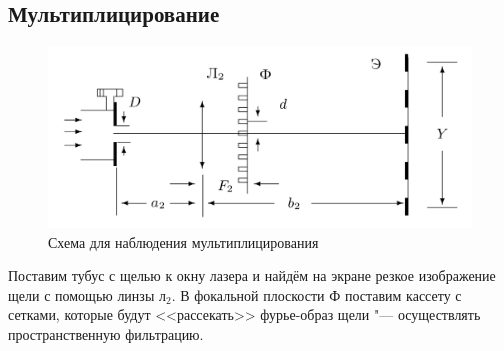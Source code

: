\documentclass[a4paper, 12pt]{article}%
\begin{document}
\subsection{Мультиплицирование}
\begin{figure}[H]
	\includegraphics[width = 1.0\linewidth]{pics/4.png}
	\caption*{Схема для наблюдения мультиплицирования}
\end{figure}	
Поставим тубус с щелью к окну лазера и найдём на экране резкое изображение щели с помощью линзы $л_2$. В фокальной плоскости Ф поставим кассету с сетками, которые будут <<рассекать>> фурье-образ щели "--- осуществлять пространственную фильтрацию.
\end{document}

